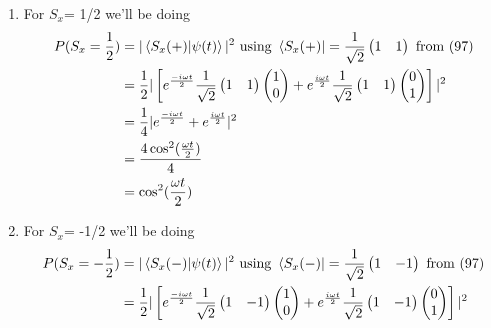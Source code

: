 \documentclass{article}
\begin{document}
\begin{enumerate}[label=\alph*)]
	\item %
	For $S_x$= 1/2 we'll be doing
	\begin{align*}
		P(S_x=\frac{1}{2}) &= | \bra{S_x(+)} \ket{\psi(t)} |^2 \text{ using } \bra{S_x(+)} 
		= \frac{1}{\sqrt{2}} \begin{pmatrix} 1 & 1 \end{pmatrix} \text{ from (97)} \\
		&= \frac{1}{2} | \left[ e^{\frac{-i\omega t}{2}} \frac{1}{\sqrt{2}} \begin{pmatrix} 1 & 1 \end{pmatrix} \begin{pmatrix} 1 \\ 0 \end{pmatrix} 
		+ e^{\frac{i\omega t}{2}} \frac{1}{\sqrt{2}} \begin{pmatrix} 1 & 1 \end{pmatrix} \begin{pmatrix} 0 \\ 1 \end{pmatrix} \right] |^2 \\
		&= \frac{1}{4} | e^{\frac{-i\omega t}{2}} + e^{\frac{i\omega t}{2}} |^2 \\
		&= \frac{4\cos^2(\frac{\omega t}{2})}{4} \\
		&= \cos^2(\frac{\omega t}{2})
	\end{align*}
	\item %
	For $S_x$= -1/2 we'll be doing
	\begin{align*}
		P(S_x=-\frac{1}{2}) &= | \bra{S_x(-)} \ket{\psi(t)} |^2 \text{ using } \bra{S_x(-)} 
		= \frac{1}{\sqrt{2}} \begin{pmatrix} 1 & -1 \end{pmatrix} \text{ from (97)} \\
		&= \frac{1}{2} | \left[ e^{\frac{-i\omega t}{2}} \frac{1}{\sqrt{2}} \begin{pmatrix} 1 & -1 \end{pmatrix} \begin{pmatrix} 1 \\ 0 \end{pmatrix} 
		+ e^{\frac{i\omega t}{2}} \frac{1}{\sqrt{2}} \begin{pmatrix} 1 & -1 \end{pmatrix} \begin{pmatrix} 0 \\ 1 \end{pmatrix} \right] |^2 \\

\end{align*}
\end{enumerate}
\end{document}
